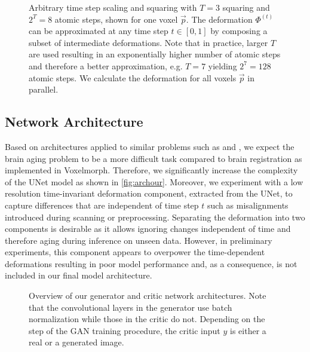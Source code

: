 

\begin{figure}
	\centering
	
	\caption{Arbitrary time step scaling and squaring with $T = 3$ squaring and $ 2^T = 8 $ atomic steps, shown for one voxel $ \vec p $. The deformation $ \Phi^{(t)} $ can be approximated at any time step $ t \in [0, 1] $ by composing a subset of intermediate deformations. Note that in practice, larger $T$ are used resulting in an exponentially higher number of atomic steps and therefore a better approximation, e.g. $T = 7$ yielding $ 2^7 = 128 $ atomic steps. We calculate the deformation for all voxels $ \vec{p} $ in parallel.} \label{fig:arbtimestep}
\end{figure}

\subsection{Network Architecture}
Based on architectures applied to similar problems such as \cite{wegmayr} and \cite{baumgartner2018visual}, we expect the brain aging problem to be a more difficult task compared to brain registration as implemented in Voxelmorph. Therefore, we significantly increase the complexity of the UNet model as shown in \autoref{fig:archour}.
Moreover, we experiment with a low resolution time-invariant deformation component, extracted from the UNet, to capture differences that are independent of time step $t$ such as misalignments introduced during scanning or preprocessing. Separating the deformation into two components is desirable as it allows ignoring changes independent of time and therefore aging during inference on unseen data.
However, in preliminary experiments, this component appears to overpower the time-dependent deformations resulting in poor model performance and, as a consequence, is not included in our final model architecture.

\begin{figure}
	\centering
	
	\caption{Overview of our generator and critic network architectures. Note that the convolutional layers in the generator use batch normalization while those in the critic do not. Depending on the step of the GAN training procedure, the critic input $y$ is either a real or a generated image.}
	\label{fig:archour}
\end{figure}

